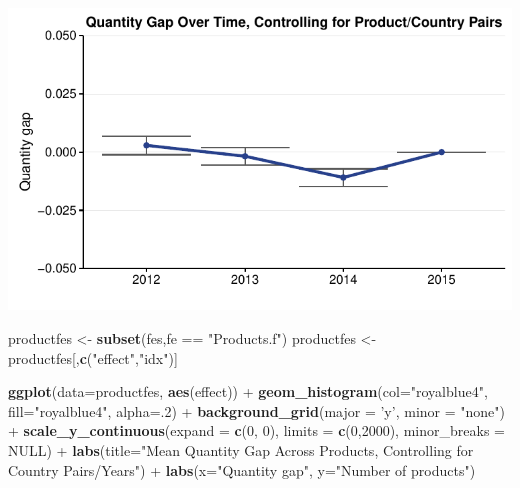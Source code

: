 \documentclass[10pt,]{article}
\newenvironment{Shaded}{\begin{snugshade}}{\end{snugshade}}
\newcommand{\KeywordTok}[1]{\textcolor[rgb]{0.13,0.29,0.53}{\textbf{{#1}}}}
\newcommand{\DataTypeTok}[1]{\textcolor[rgb]{0.13,0.29,0.53}{{#1}}}
\newcommand{\DecValTok}[1]{\textcolor[rgb]{0.00,0.00,0.81}{{#1}}}
\newcommand{\StringTok}[1]{\textcolor[rgb]{0.31,0.60,0.02}{{#1}}}
\newcommand{\OtherTok}[1]{\textcolor[rgb]{0.56,0.35,0.01}{{#1}}}
\newcommand{\NormalTok}[1]{{#1}}
\begin{document}
\begin{center}\includegraphics{Figs/qty_summary-10} \end{center}

\begin{Shaded}
\begin{Highlighting}[]
\NormalTok{productfes <-}\StringTok{ }\KeywordTok{subset}\NormalTok{(fes,fe ==}\StringTok{ "Products.f"}\NormalTok{)}
\NormalTok{productfes <-}\StringTok{ }\NormalTok{productfes[,}\KeywordTok{c}\NormalTok{(}\StringTok{"effect"}\NormalTok{,}\StringTok{"idx"}\NormalTok{)]}

\KeywordTok{ggplot}\NormalTok{(}\DataTypeTok{data=}\NormalTok{productfes, }\KeywordTok{aes}\NormalTok{(effect)) +}
\StringTok{  }\KeywordTok{geom_histogram}\NormalTok{(}\DataTypeTok{col=}\StringTok{"royalblue4"}\NormalTok{,}
                 \DataTypeTok{fill=}\StringTok{"royalblue4"}\NormalTok{,}
                 \DataTypeTok{alpha=}\NormalTok{.}\DecValTok{2}\NormalTok{) +}
\StringTok{  }\KeywordTok{background_grid}\NormalTok{(}\DataTypeTok{major =} \StringTok{'y'}\NormalTok{, }\DataTypeTok{minor =} \StringTok{"none"}\NormalTok{) +}
\StringTok{  }\KeywordTok{scale_y_continuous}\NormalTok{(}\DataTypeTok{expand =} \KeywordTok{c}\NormalTok{(}\DecValTok{0}\NormalTok{, }\DecValTok{0}\NormalTok{), }\DataTypeTok{limits =} \KeywordTok{c}\NormalTok{(}\DecValTok{0}\NormalTok{,}\DecValTok{2000}\NormalTok{), }\DataTypeTok{minor_breaks =} \OtherTok{NULL}\NormalTok{) +}
\StringTok{  }\KeywordTok{labs}\NormalTok{(}\DataTypeTok{title=}\StringTok{"Mean Quantity Gap Across Products, Controlling for Country Pairs/Years"}\NormalTok{) +}
\StringTok{  }\KeywordTok{labs}\NormalTok{(}\DataTypeTok{x=}\StringTok{"Quantity gap"}\NormalTok{, }\DataTypeTok{y=}\StringTok{"Number of products"}\NormalTok{)}
\end{Highlighting}
\end{Shaded}
\end{document}
